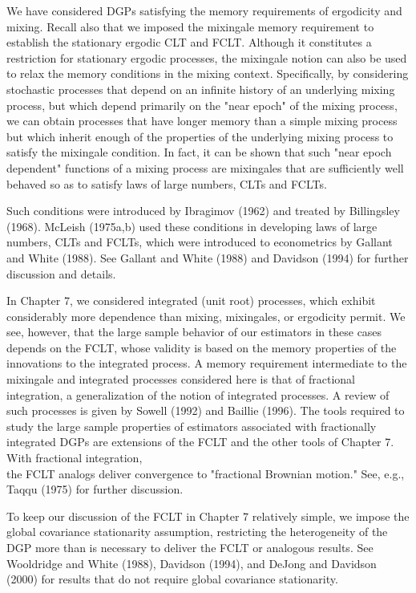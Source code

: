 \documentclass[10pt]{article}
\begin{document}
We have considered DGPs satisfying the memory requirements of ergodicity and mixing. Recall also that we imposed the mixingale memory requirement to establish the stationary ergodic CLT and FCLT. Although it constitutes a restriction for stationary ergodic processes, the mixingale notion can also be used to relax the memory conditions in the mixing context. Specifically, by considering stochastic processes that depend on an infinite history of an underlying mixing process, but which depend primarily on the "near epoch" of the mixing process, we can obtain processes that have longer memory than a simple mixing process but which inherit enough of the properties of the underlying mixing process to satisfy the mixingale condition. In fact, it can be shown that such "near epoch dependent" functions of a mixing process are mixingales that are sufficiently well behaved so as to satisfy laws of large numbers, CLTs and FCLTs.

Such conditions were introduced by Ibragimov (1962) and treated by Billingsley (1968). McLeish (1975a,b) used these conditions in developing laws of large numbers, CLTs and FCLTs, which were introduced to econometrics by Gallant and White (1988). See Gallant and White (1988) and Davidson (1994) for further discussion and details.

In Chapter 7, we considered integrated (unit root) processes, which exhibit considerably more dependence than mixing, mixingales, or ergodicity permit. We see, however, that the large sample behavior of our estimators in these cases depends on the FCLT, whose validity is based on the memory properties of the innovations to the integrated process. A memory requirement intermediate to the mixingale and integrated processes considered here is that of fractional integration, a generalization of the notion of integrated processes. A review of such processes is given by Sowell (1992) and Baillie (1996). The tools required to study the large sample properties of estimators associated with fractionally integrated DGPs are extensions of the FCLT and the other tools of Chapter 7. With fractional integration,\\
the FCLT analogs deliver convergence to "fractional Brownian motion." See, e.g., Taqqu (1975) for further discussion.

To keep our discussion of the FCLT in Chapter 7 relatively simple, we impose the global covariance stationarity assumption, restricting the heterogeneity of the DGP more than is necessary to deliver the FCLT or analogous results. See Wooldridge and White (1988), Davidson (1994), and DeJong and Davidson (2000) for results that do not require global covariance stationarity.
\end{document}
